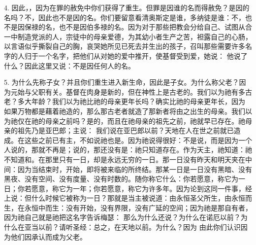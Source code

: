 4.   因此，，因为在罪的赦免中你们获得了重生。但罪是因谁的名而得赦免？是因的名吗？不，因此也不是因的名。你们要留意看清奥斯定是谁，多纳徒是谁：不，也不是因保禄的名，也不是因伯多禄的名。因为对于那些把教会分给自己、试图从合一中制造党派的人，宗徒中的母亲爱德，为其幼小者生产之苦，袒露自己的心肠，以言语似乎撕裂自己的胸，哀哭她所见已死去并生出的孩子，召叫那些需要许多名字的人归于一个名字，把他们从对她的爱中推开，使基督受到爱，她说：  他说了什么？因此这里又说：不是因任何人的名。\par

5.  为什么先称子女？并且你们重生进入新生命，因此是子女。为什么称父老？因为元始与父职有关。基督在肉身是新的，但在神性上是古老的。我们以为祂有多古老？多大年龄？我们以为祂比祂的母亲更年长吗？确实比祂的母亲更年长，因为 如果万物都是藉着祂造的，那么那古老者就造了那新者将由之出生的母亲。我们以为祂仅在祂的母亲之前吗？是的，而且在祂母亲的祖先之前，祂就早已存在。祂母亲的祖先乃是亚巴郎；主说： 我们说在亚巴郎以前？天地在人在世之前就已造成。在这些之前已有主，不如说祂也是。因为祂说得很好：不是说，而是因为一个人说的，那就不再是；说的，那还没有是：祂只知道存在。作为天主，祂知道：祂不知道和。在那里只有一日，却是永远无穷的一日。那一日没有昨天和明天夹在中间：因为当结束时，开始，即将被来临的所终结。那某一日是一日没有黑暗、没有黑夜、没有空间、没有度量、没有时数的。随你称它什么：你若愿意，称它为一日；你若愿意，称它为一年；你若愿意，称它为许多年。因为论到这同一件事，经上说：但什么时候它被称为一日？那就是当主被说道：由永恒圣父所生，由永恒而生，在永恒中而生：没有开始，没有界限，没有广延的空间；因为祂是那自有者，因为祂自己就是祂把这名字告诉梅瑟： 那么为什么还说？为什么在诺厄以前？为什么在亚当以前？请听圣经：总之，在天地以前。为什么？因为 由此你们认识因为他们因承认而成为父老。\par

